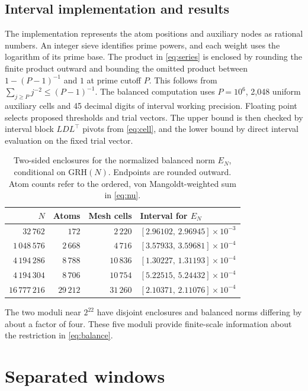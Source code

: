 \documentclass[11pt,a4paper]{article}
\numberwithin{equation}{section}
\newcommand{\grh}{\mathrm{GRH}}
\begin{document}
\subsection{Interval implementation and results}

The implementation represents the atom positions and auxiliary nodes
as rational numbers. An integer sieve identifies prime powers, and
each weight uses the logarithm of its prime base. The product in
\cref{eq:series} is enclosed by rounding the finite product outward
and bounding the omitted product between $1-(P-1)^{-1}$ and $1$
at prime cutoff $P$. This follows from
$\sum_{j\ge P}j^{-2}\le (P-1)^{-1}$. The balanced computation uses
$P=10^6$, 2,048 uniform auxiliary cells and 45 decimal digits of
interval working precision. Floating point selects proposed
thresholds and trial vectors. The upper bound is then checked by
interval block $LDL^\top$ pivots from \cref{eq:cell}, and the lower
bound by direct interval evaluation on the fixed trial vector.

\begin{table}[htbp]
\centering
\caption{Two-sided enclosures for the normalized balanced norm $E_N$,
conditional on $\grh(N)$. Endpoints are rounded outward. Atom counts
refer to the ordered, von Mangoldt-weighted sum in \cref{eq:nu}.}
\label{tab:balanced}
\small
\begin{tabular}{@{}r r r l@{}}
\toprule
$N$ & Atoms & Mesh cells & Interval for $E_N$\\
\midrule
$32\,762$     & $172$    & $2\,220$  & $[2.96102,\,2.96945]\times10^{-3}$\\
$1\,048\,576$ & $2\,668$ & $4\,716$  & $[3.57933,\,3.59681]\times10^{-4}$\\
$4\,194\,286$ & $8\,788$ & $10\,836$ & $[1.30227,\,1.31193]\times10^{-4}$\\
$4\,194\,304$ & $8\,706$ & $10\,754$ & $[5.22515,\,5.24432]\times10^{-4}$\\
$16\,777\,216$& $29\,212$& $31\,260$ & $[2.10371,\,2.11076]\times10^{-4}$\\
\bottomrule
\end{tabular}
\end{table}

The two moduli near $2^{22}$ have disjoint enclosures and balanced
norms differing by about a factor of four. These five moduli provide
finite-scale information about the restriction in \cref{eq:balance}.

\section{Separated windows}
\label{sec:rect}
\end{document}
